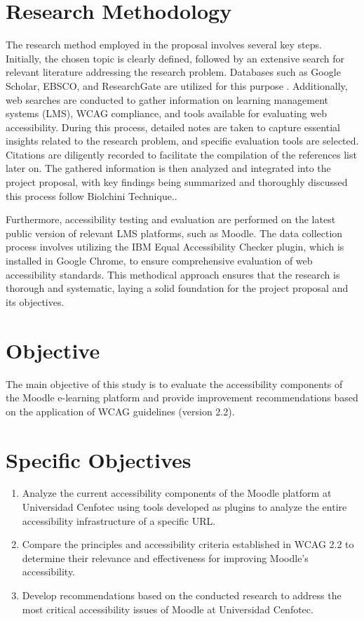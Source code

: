 \documentclass{IEEEtran}
\begin{document}
\section{Research Methodology}
The research method employed in the proposal involves several key steps. Initially, the chosen topic is clearly defined, followed by an extensive search for relevant literature addressing the research problem. Databases such as Google Scholar, EBSCO, and ResearchGate are utilized for this purpose  \cite{TTawalbeh2017}. Additionally, web searches are conducted to gather information on learning management systems (LMS), WCAG compliance, and tools available for evaluating web accessibility. During this process, detailed notes are taken to capture essential insights related to the research problem, and specific evaluation tools are selected. Citations are diligently recorded to facilitate the compilation of the references list later on. The gathered information is then analyzed and integrated into the project proposal, with key findings being summarized and thoroughly discussed this process follow Biolchini Technique.\cite{FerrariFabianoJose}.

Furthermore, accessibility testing and evaluation are performed on the latest public version of relevant LMS platforms, such as Moodle. The data collection process involves utilizing the IBM Equal Accessibility Checker plugin, which is installed in Google Chrome, to ensure comprehensive evaluation of web accessibility standards.
This methodical approach ensures that the research is thorough and systematic, laying a solid foundation for the project proposal and its objectives.


\section{Objective}
The main objective of this study is to evaluate the accessibility components of the Moodle e-learning platform and provide improvement recommendations based on the application of WCAG guidelines (version 2.2).

\section{Specific Objectives}
\begin{enumerate}
    \item Analyze the current accessibility components of the Moodle platform at Universidad Cenfotec using tools developed as plugins to analyze the entire accessibility infrastructure of a specific URL.
    \item Compare the principles and accessibility criteria established in WCAG 2.2 to determine their relevance and effectiveness for improving Moodle's accessibility.
    \item Develop recommendations based on the conducted research to address the most critical accessibility issues of Moodle at Universidad Cenfotec.
\end{enumerate}
\end{document}
